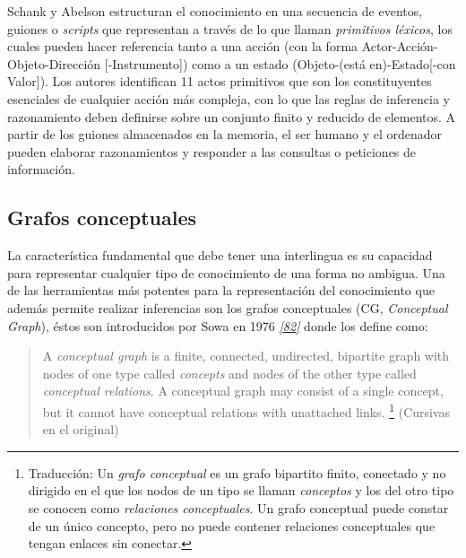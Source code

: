 \documentclass[a4paper,12pt,spanish]{book}
\begin{document}
Schank y Abelson estructuran el conocimiento en una secuencia de eventos,
guiones o \emph{scripts} que representan a través de lo que llaman \emph{primitivos léxicos}, los cuales
pueden hacer referencia tanto a una acción (con la forma Actor-Acción-Objeto-Dirección
{[}-Instrumento{]}) como a un estado (Objeto-(está en)-Estado{[}-con Valor{]}). Los autores
identifican 11 actos primitivos que son los constituyentes esenciales de cualquier acción
más compleja, con lo que las reglas de inferencia y razonamiento deben definirse sobre
un conjunto finito y reducido de elementos. A partir de los guiones almacenados en la
memoria, el ser humano y el ordenador pueden elaborar razonamientos y responder a las
consultas o peticiones de información.


\subsection{Grafos conceptuales}
\label{1.state-of-the-art/i.representacion-conocimiento:grafos-conceptuales}\label{1.state-of-the-art/i.representacion-conocimiento:id9}
La característica fundamental que debe tener una interlingua es su capacidad para
representar cualquier tipo de conocimiento de una forma no ambigua. Una de las
herramientas más potentes para la representación del conocimiento que además
permite realizar inferencias son los grafos conceptuales (CG, \emph{Conceptual Graph}),
éstos son introducidos por Sowa en 1976 \label{1.state-of-the-art/i.representacion-conocimiento:id10}{\hyperref[zreferences:sowa1976]{\emph{{[}82{]}}}} donde los define como:
\begin{quote}

A \emph{conceptual graph} is a finite, connected, undirected, bipartite graph with
nodes of one type called \emph{concepts} and nodes of the other type called
\emph{conceptual relations}. A conceptual graph may consist of a single concept,
but it cannot have conceptual relations with unattached links. \footnote{
Traducción: Un \emph{grafo conceptual} es un grafo bipartito finito, conectado y no
dirigido en el que los nodos de un tipo se llaman \emph{conceptos} y los del otro tipo se
conocen como \emph{relaciones conceptuales}. Un grafo conceptual puede constar de un único
concepto, pero no puede contener relaciones conceptuales que tengan enlaces sin conectar.
}
(Cursivas en el original)
\end{quote}
\end{document}
